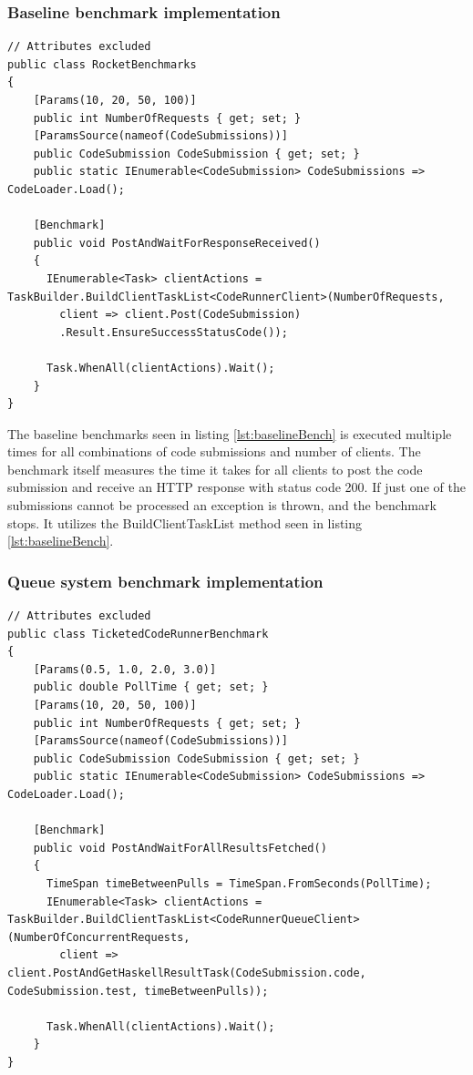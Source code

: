 \subsubsection{Baseline benchmark implementation}
\begin{lstlisting}[language=CSharp, escapechar=~, caption={C\# code showing the implementation of the benchmark for the baseline.}, label={lst:baselineBench}]
// Attributes excluded
public class RocketBenchmarks
{
    [Params(10, 20, 50, 100)] 
    public int NumberOfRequests { get; set; }
    [ParamsSource(nameof(CodeSubmissions))]
    public CodeSubmission CodeSubmission { get; set; }
    public static IEnumerable<CodeSubmission> CodeSubmissions => CodeLoader.Load();

    [Benchmark]
    public void PostAndWaitForResponseReceived()
    {
      IEnumerable<Task> clientActions = TaskBuilder.BuildClientTaskList<CodeRunnerClient>(NumberOfRequests,
        client => client.Post(CodeSubmission)
        .Result.EnsureSuccessStatusCode());
        
      Task.WhenAll(clientActions).Wait();
    }
}
\end{lstlisting}
The baseline benchmarks seen in listing \ref{lst:baselineBench} is executed multiple times for all combinations of code submissions and number of clients.
The benchmark itself measures the time it takes for all clients to post the code submission and receive an HTTP response with status code 200.
If just one of the submissions cannot be processed an exception is thrown, and the benchmark stops.
It utilizes the BuildClientTaskList method seen in listing \ref{lst:baselineBench}.

\subsubsection{Queue system benchmark implementation}
\begin{lstlisting}[language=CSharp, escapechar=~, caption={C\# code showing the implementation of the benchmark for the backend with the Queue System. }, label={lst:queueSystemBench}]
// Attributes excluded
public class TicketedCodeRunnerBenchmark
{
    [Params(0.5, 1.0, 2.0, 3.0)] 
    public double PollTime { get; set; }
    [Params(10, 20, 50, 100)] 
    public int NumberOfRequests { get; set; }
    [ParamsSource(nameof(CodeSubmissions))] 
    public CodeSubmission CodeSubmission { get; set; }
    public static IEnumerable<CodeSubmission> CodeSubmissions => CodeLoader.Load();

    [Benchmark]
    public void PostAndWaitForAllResultsFetched()
    {
      TimeSpan timeBetweenPulls = TimeSpan.FromSeconds(PollTime);
      IEnumerable<Task> clientActions = TaskBuilder.BuildClientTaskList<CodeRunnerQueueClient>(NumberOfConcurrentRequests, 
        client => client.PostAndGetHaskellResultTask(CodeSubmission.code, CodeSubmission.test, timeBetweenPulls));

      Task.WhenAll(clientActions).Wait();
    }
}
\end{lstlisting}

